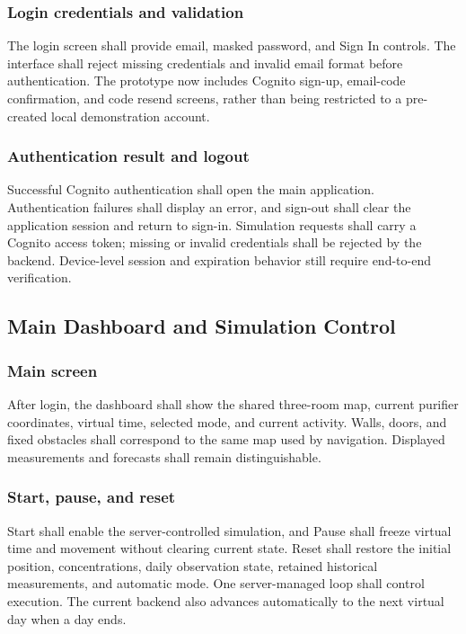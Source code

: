 \documentclass[conference]{IEEEtran}
\begin{document}
\subsubsection{Login credentials and validation}

The login screen shall provide email, masked password, and Sign In controls. The interface shall reject missing credentials and invalid email format before authentication. The prototype now includes Cognito sign-up, email-code confirmation, and code resend screens, rather than being restricted to a pre-created local demonstration account.

\subsubsection{Authentication result and logout}

Successful Cognito authentication shall open the main application. Authentication failures shall display an error, and sign-out shall clear the application session and return to sign-in. Simulation requests shall carry a Cognito access token; missing or invalid credentials shall be rejected by the backend. Device-level session and expiration behavior still require end-to-end verification.

\subsection{Main Dashboard and Simulation Control}

\subsubsection{Main screen}

After login, the dashboard shall show the shared three-room map, current purifier coordinates, virtual time, selected mode, and current activity. Walls, doors, and fixed obstacles shall correspond to the same map used by navigation. Displayed measurements and forecasts shall remain distinguishable.

\subsubsection{Start, pause, and reset}

Start shall enable the server-controlled simulation, and Pause shall freeze virtual time and movement without clearing current state. Reset shall restore the initial position, concentrations, daily observation state, retained historical measurements, and automatic mode. One server-managed loop shall control execution. The current backend also advances automatically to the next virtual day when a day ends.
\end{document}

